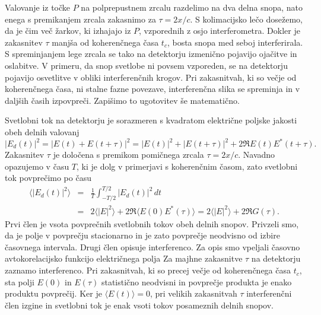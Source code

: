 Valovanje iz točke $P$ na polprepustnem 
zrcalu razdelimo na dva delna snopa, nato enega s premikanjem zrcala zakasnimo za $\tau=2x/c$.
S kolimacijsko lečo dosežemo, da je čim več žarkov, ki izhajajo iz
$P$, vzporednih z osjo interferometra. Dokler je zakasnitev
$\tau$ manjša od koherenčnega časa $t_{c}$, bosta snopa med seboj interferirala.
S spreminjanjem lege zrcala se tako na detektorju izmenično pojavijo ojačitve in oslabitve.
V primeru, da snop svetlobe ni povsem vzporeden, se na detektorju pojavijo 
osvetlitve v obliki interferenčnih krogov. Pri zakasnitvah,
ki so večje od koherenčnega časa, ni stalne fazne povezave, interferenčna
slika se spreminja in v daljših časih izpovpreči. Zapišimo to ugotovitev
še matematično.

Svetlobni tok na detektorju je sorazmeren s kvadratom električne
poljske jakosti obeh delnih valovanj
\begin{equation}
|E_{d}(t)|^{2}=|E(t)+E(t+\tau)|^{2}=|E(t)|^{2}+|E(t+\tau)|^{2}+2\Re E(t)E^{*}(t+\tau).
\label{eq:Michelson-intenziteta}
\end{equation}
Zakasnitev $\tau$ je določena s premikom pomičnega zrcala $\tau=2x/c$.
Navadno opazujemo v času $T$, ki je dolg v primerjavi s koherenčnim
časom, zato svetlobni tok povprečimo po času
\begin{eqnarray}
\langle|E_{d}(t)|^{2}\rangle & = & \frac{1}{T}\int_{-T/2}^{T/2}|E{}_{d}(t)|^{2}\, dt\nonumber \\
 & = & 2\langle|E|^{2}\rangle+2\Re\langle E(0)E^{*}(\tau)\rangle = 2\langle|E|^{2}\rangle+2\Re G(\tau).
\end{eqnarray}
Prvi člen je vsota povprečnih svetlobnih tokov obeh delnih snopov. Privzeli
smo, da je polje v povprečju stacionarno in je zato povprečje neodvisno
od izbire časovnega intervala. Drugi člen opisuje interferenco. 
Za opis smo vpeljali
časovno avtokorelacijsko funkcijo
električnega polja 
Za majhne zakasnitve $\tau$ na
detektorju zaznamo interferenco. Pri zakasnitvah, ki so precej
večje od koherenčnega časa $t_{c}$, sta polji $E(0)$ in $E(\tau)$
statistično neodvisni in povprečje produkta je enako produktu povprečij.
Ker je $\langle E(t)\rangle=0$, pri velikih zakasnitvah $\tau$ interferenčni
člen izgine in svetlobni tok je enak vsoti tokov posameznih delnih
snopov. 

